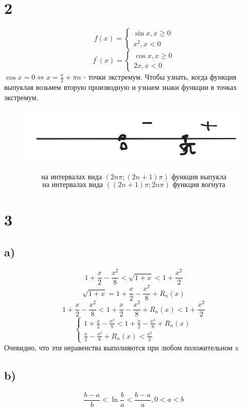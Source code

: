 {   \section*{2}
    $$f(x) =\begin{cases}
   	\sin x , x\geqslant 0 \\
   	x^2 , x< 0
   \end{cases}$$
    $$f^{'}(x) = \begin{cases}
   		\cos x, x\geqslant 0 \\
   		2x , x<0
   \end{cases}$$
   $\cos x =0 \iff x = \frac{\pi}{2}+\pi n $ - точки экстремум. 
   Чтобы узнать, когда функция выпуклая возьмем вторую производную и узнаем знаки функции в точках экстремум. 
          \begin{figure}[h]
   	
   	\centering
   	
   	\includegraphics[width=0.8\linewidth]{Screenshot from 2024-01-15 20-53-03.png}
   	\caption{}
   	\label{fig:mpr}
   	$$\text{на интервалах вида } (2n\pi; (2n+1)\pi)\text{ функция выпукла}$$
   	   	$$\text{на интервалах вида } ((2n+1)\pi; 2n\pi)\text{ функция вогнута}$$
   	
   \end{figure}
    \section*{3 }
    \subsection*{a)}
    $$1+\frac{x}{2}-\frac{x^2}{8}<\sqrt{1+x}< 1+\frac{x^2}{2}$$
    $$\sqrt{1+x} = 1+\frac{x}{2}-\frac{x^2}{8} + R_n(x)$$
	$$1+\frac{x}{2}-\frac{x^2}{8}<1+\frac{x}{2}-\frac{x^2}{8} + R_n(x)< 1+\frac{x^2}{2}$$ 
	$$\begin{cases*}
		1+\frac{x}{2}-\frac{x^2}{8}<1+\frac{x}{2}-\frac{x^2}{8} + R_n(x) \\
		\frac{x}{2}-\frac{x^2}{8} + R_n(x)< \frac{x^2}{2}
	\end{cases*} $$
  Очевидно, что эти неравенства выполняются при любом положительном x
  \subsection*{b)}
  $$\frac{b-a}{b}< \ln{\frac{b}{a}}<\frac{b-a}{a}, 0<a<b$$
}
